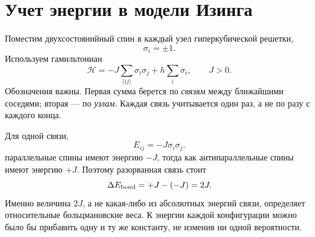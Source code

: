 \section{Учет энергии в модели Изинга}

Поместим двухсостоянийный спин в каждый узел гиперкубической решетки,
\begin{equation}
\sigma_i=\pm1.
\end{equation}
Используем гамильтониан
\begin{equation}
\mathcal H
=-J\sum_{\langle ij\rangle}\sigma_i\sigma_j
+h\sum_i\sigma_i,
\qquad J>0.
\label{eq:ising-hamiltonian}
\end{equation}
Обозначения важны. Первая сумма берется по \emph{связям} между ближайшими соседями; вторая — по \emph{узлам}. Каждая связь учитывается один раз, а не по разу с каждого конца.

Для одной связи,
\begin{equation}
E_{ij}=-J\sigma_i\sigma_j.
\end{equation}
параллельные спины имеют энергию \(-J\), тогда как антипараллельные спины имеют энергию \(+J\). Поэтому разорванная связь стоит
\begin{equation}
\Delta E_{\rm bond}=+J-(-J)=2J.
\label{eq:broken-bond}
\end{equation}
Именно величина \(2J\), а не какая-либо из абсолютных энергий связи, определяет относительные больцмановские веса. К энергии каждой конфигурации можно было бы прибавить одну и ту же константу, не изменив ни одной вероятности.

\begin{classroomqa}
\end{classroomqa}

\begin{classroomqa}
\end{classroomqa}

